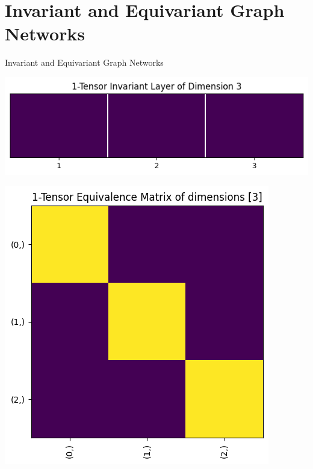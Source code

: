 \documentclass{beamer}
\begin{document}
\section{Invariant and Equivariant Graph Networks}

\begin{frame}{Invariant and Equivariant Graph Networks}
    \begin{center}
        \begin{minipage}[t]{0.45\textwidth}
            \raggedright %
            \vspace{0pt} %
            \includegraphics[width=\textwidth]{../figures/1-tensor-inv.png}
        \end{minipage}
        \hfill
        \begin{minipage}[t]{0.45\textwidth}
            \raggedright %
            \vspace{0pt} %
            \includegraphics[width=\textwidth]{../figures/1-tensor-eq.png}
        \end{minipage}
    \end{center}
\end{frame}
\end{document}
